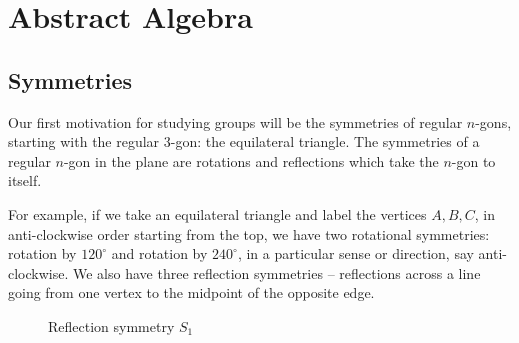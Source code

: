 \chapter{Abstract Algebra}
\label{ch:abstract}

\section{Symmetries}

Our first motivation for studying groups will be the symmetries of regular $n$-gons, starting with the regular $3$-gon: the equilateral triangle. The symmetries of a regular $n$-gon in the plane are rotations and reflections which take the $n$-gon to itself.

For example, if we take an equilateral triangle and label the vertices $A, B, C$, in anti-clockwise order starting from the top, we have two rotational symmetries: rotation by $120^\circ$ and rotation by $240^\circ$, in a particular sense or direction, say anti-clockwise. We also have three reflection symmetries -- reflections across a line going from one vertex to the midpoint of the opposite edge.

\begin{figure}[ht!]
    \centering
\caption{Reflection symmetry $S_1$}
\label{fig:triangle-reflection}
\end{figure}

